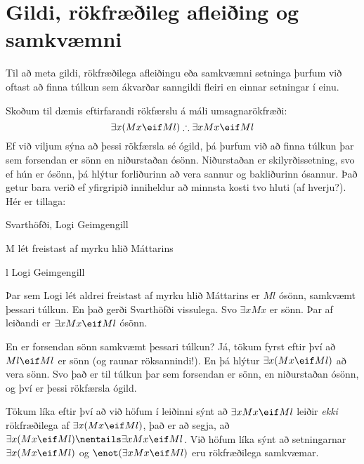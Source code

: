 \section{Gildi, rökfræðileg afleiðing og samkvæmni}
Til að meta gildi, rökfræðilega afleiðingu eða samkvæmni setninga þurfum við oftast að finna túlkun sem ákvarðar sanngildi fleiri en einnar setningar í einu. 

Skoðum til dæmis eftirfarandi rökfærslu á máli umsagnarökfræði:
	$$\exists x(Mx \eif Ml) \therefore \exists x Mx \eif Ml$$
Ef við viljum sýna að þessi rökfærsla sé ógild, þá þurfum við að finna túlkun þar sem forsendan er sönn en niðurstaðan ósönn. Niðurstaðan er skilyrðissetning, svo ef hún er ósönn, þá hlýtur forliðurinn að vera sannur og bakliðurinn ósannur. Það getur bara verið ef yfirgripið inniheldur að minnsta kosti tvo hluti (af hverju?). Hér er tillaga:
	
\begin{ekey}
	\item[\text{yfirgrip}] Svarthöfði, Logi Geimgengill
	\item[M]  lét freistast af myrku hlið Máttarins
	\item[l] Logi Geimgengill
\end{ekey}
Þar sem Logi lét aldrei freistast af myrku hlið Máttarins er $Ml$ ósönn, samkvæmt þessari túlkun. En það gerði Svarthöfði vissulega. Svo $\exists x Mx$ er sönn. Þar af leiðandi er $\exists x Mx \eif Ml$ ósönn.

En er forsendan sönn samkvæmt þessari túlkun? Já, tökum fyrst eftir því að $Ml \eif Ml$ er sönn (og raunar röksannindi!). En þá hlýtur $\exists x (Mx \eif Ml)$ að vera sönn. Svo það er til túlkun þar sem forsendan er sönn, en niðurstaðan ósönn, og því er þessi rökfærsla ógild.

Tökum líka eftir því að við höfum í leiðinni sýnt að $\exists x Mx \eif Ml$ leiðir \emph{ekki} rökfræðilega af $\exists x(Mx \eif Ml)$, það er að segja, að $\exists x(Mx \eif Ml) \nentails \exists x Mx \eif Ml$. Við höfum líka sýnt að setningarnar $\exists x(Mx \eif Ml)$ og $\enot(\exists x Mx \eif Ml)$ eru rökfræðilega samkvæmar.

